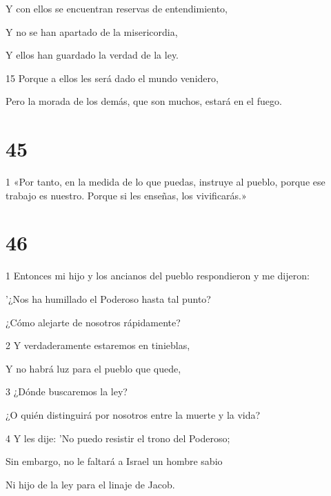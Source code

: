 \par Y con ellos se encuentran reservas de entendimiento,

\par Y no se han apartado de la misericordia,

\par Y ellos han guardado la verdad de la ley.

\par 15 Porque a ellos les será dado el mundo venidero,

\par Pero la morada de los demás, que son muchos, estará en el fuego.

\chapter{45}

\par 1 «Por tanto, en la medida de lo que puedas, instruye al pueblo, porque ese trabajo es nuestro. Porque si les enseñas, los vivificarás.»

\chapter{46}

\par 1 Entonces mi hijo y los ancianos del pueblo respondieron y me dijeron:

\par '¿Nos ha humillado el Poderoso hasta tal punto?

\par ¿Cómo alejarte de nosotros rápidamente?

\par 2 Y verdaderamente estaremos en tinieblas,

\par Y no habrá luz para el pueblo que quede,

\par 3 ¿Dónde buscaremos la ley?

\par ¿O quién distinguirá por nosotros entre la muerte y la vida?

\par 4 Y les dije: 'No puedo resistir el trono del Poderoso;

\par Sin embargo, no le faltará a Israel un hombre sabio

\par Ni hijo de la ley para el linaje de Jacob.

